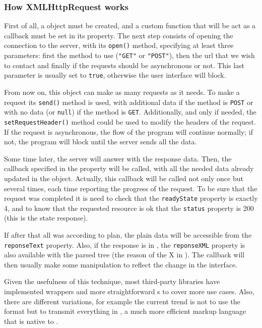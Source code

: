 \subsubsection{How XMLHttpRequest works} %
\label{ssub:xmlhttprequest}

First of all, a  object must be created, and a custom function that will be act as a callback must be set in its  property.
The next step consists of opening the connection to the server, with its \texttt{open()} method, specifying at least three parameters: first the  method to use (\texttt{"GET"} or \texttt{"POST"}), then the url that we wish to contact and finally if the requests should be asynchronous or not.
This last parameter is usually set to \texttt{true}, otherwise the user interface will block.

From now on, this object can make as many requests as it needs.
To make a request its \texttt{send()} method is used, with additional data if the method is \texttt{POST} or with no data (or \texttt{null}) if the method is \texttt{GET}.
Additionally, and only if needed, the \texttt{setRequestHeader()} method could be used to modify the headers of the  request.
If the request is asynchronous, the flow of the program will continue normally; if not, the program will block until the server sends all the data.

Some time later, the server will answer with the response data.
Then, the callback specified in the  property will be called, with all the needed data already updated in the  object.
Actually, this callback will be called not only once but several times, each time reporting the progress of the request.
To be sure that the request was completed it is need to check that the \texttt{readyState} property is exactly 4, and to know that the requested resource is ok that the \texttt{status} property is 200 (this is the  state response).

If after that all was according to plan, the plain data will be accessible from the \texttt{reponseText} property.
Also, if the response is in , the \texttt{reponseXML} property is also available with the parsed  tree (the reason of the X in ).
The callback will then usually make some  manipulation to reflect the change in the interface.

Given the usefulness of this technique, most third-party libraries have implemented wrappers and more straightforward s to cover more use cases.
Also, there are different variations, for example the current trend is not to use the  format but to transmit everything in , a much more efficient markup language that is native to .


